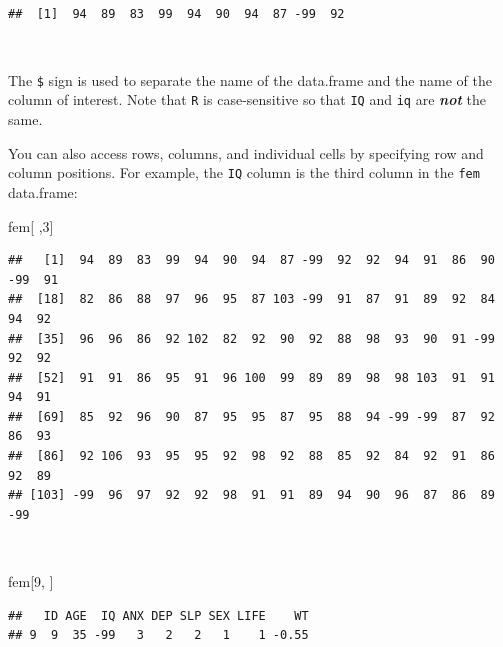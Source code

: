 \documentclass[12pt,a4paper]{book}
\newenvironment{Shaded}{\begin{snugshade}}{\end{snugshade}}
\newcommand{\DecValTok}[1]{\textcolor[rgb]{0.00,0.00,0.81}{#1}}
\newcommand{\OperatorTok}[1]{\textcolor[rgb]{0.81,0.36,0.00}{\textbf{#1}}}
\newcommand{\NormalTok}[1]{#1}
\theoremstyle{definition}
\theoremstyle{definition}
\theoremstyle{definition}
\theoremstyle{remark}
\begin{document}
~

\begin{Shaded}
\end{Shaded}

\begin{verbatim}
##  [1]  94  89  83  99  94  90  94  87 -99  92
\end{verbatim}

~

The \texttt{\$} sign is used to separate the name of the data.frame and
the name of the column of interest. Note that \texttt{R} is
case-sensitive so that \texttt{IQ} and \texttt{iq} are
\textbf{\emph{not}} the same.

You can also access rows, columns, and individual cells by specifying
row and column positions. For example, the \texttt{IQ} column is the
third column in the \texttt{fem} data.frame:

\begin{Shaded}
\begin{Highlighting}[]
\NormalTok{fem[ ,}\DecValTok{3}\NormalTok{]}
\end{Highlighting}
\end{Shaded}

\begin{verbatim}
##   [1]  94  89  83  99  94  90  94  87 -99  92  92  94  91  86  90 -99  91
##  [18]  82  86  88  97  96  95  87 103 -99  91  87  91  89  92  84  94  92
##  [35]  96  96  86  92 102  82  92  90  92  88  98  93  90  91 -99  92  92
##  [52]  91  91  86  95  91  96 100  99  89  89  98  98 103  91  91  94  91
##  [69]  85  92  96  90  87  95  95  87  95  88  94 -99 -99  87  92  86  93
##  [86]  92 106  93  95  95  92  98  92  88  85  92  84  92  91  86  92  89
## [103] -99  96  97  92  92  98  91  91  89  94  90  96  87  86  89 -99
\end{verbatim}

~

\begin{Shaded}
\begin{Highlighting}[]
\NormalTok{fem[}\DecValTok{9}\NormalTok{, ]}
\end{Highlighting}
\end{Shaded}

\begin{verbatim}
##   ID AGE  IQ ANX DEP SLP SEX LIFE    WT
## 9  9  35 -99   3   2   2   1    1 -0.55
\end{verbatim}
\end{document}
